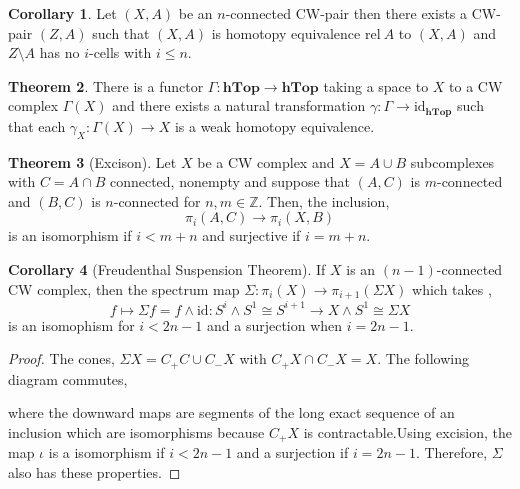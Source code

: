 \documentclass[12pt]{extarticle}
\newcommand{\Z}{\mathbb{Z}}
\newcommand{\id}{\mathrm{id}}
\newcommand{\hTop}{\mathbf{hTop}}
\theoremstyle{definition}
\newtheorem{theorem}{Theorem}[section]
\newtheorem{corollary}[theorem]{Corollary}
\begin{document}
\begin{corollary}
Let $(X, A)$ be an $n$-connected CW-pair then there exists a CW-pair $(Z, A)$ such that $(X, A)$ is homotopy equivalence $\mathrm{rel}\: A$ to $(X, A)$ and $Z \setminus A$ has no $i$-cells with $i \le n$.  
\end{corollary}

\begin{theorem}
There is a functor $\Gamma : \hTop \to \hTop$ taking a space to $X$ to a CW complex $\Gamma(X)$ and there exists a natural transformation $\gamma : \Gamma \to \id_{\hTop}$ such that each $\gamma_X : \Gamma(X) \to X$ is a weak homotopy equivalence. 
\end{theorem}

\begin{theorem}[Excison]
Let $X$ be a CW complex and $X = A \cup B$ subcomplexes with $C = A \cap B$ connected, nonempty and suppose that $(A, C)$ is $m$-connected and $(B, C)$ is $n$-connected for $n,m \in \Z$. Then, the inclusion,
\[ \pi_i(A, C) \to \pi_i(X, B)\]
is an isomorphism if $i < m + n$ and surjective if $i = m + n$.   
\end{theorem}

\begin{corollary}[Freudenthal Suspension Theorem]
If $X$ is an $(n-1)$-connected CW complex, then the spectrum map $\Sigma : \pi_i(X) \to \pi_{i+1}(\Sigma X)$ which takes ,
\[ f \mapsto \Sigma f = f \wedge \id : S^i \wedge S^1 \cong S^{i+1} \to X \wedge S^1 \cong \Sigma X \] 
is an isomophism for $ i < 2 n - 1$ and a surjection when $i = 2 n - 1$. 
\end{corollary}

\begin{proof}
The cones, $\Sigma X = C_+ C \cup C_{-} X$ with $C_+ X \cap C_{-} X = X$. The following diagram commutes,
\begin{center}
\end{center}
where the downward maps are segments of the long exact sequence of an inclusion which are isomorphisms because $C_{+}X$ is contractable.Using excision, the map $\iota$ is a isomorphism if $i < 2 n - 1$ and a surjection if $ i = 2n - 1$. Therefore, $\Sigma$ also has these properties.   
\end{proof}
\end{document}
